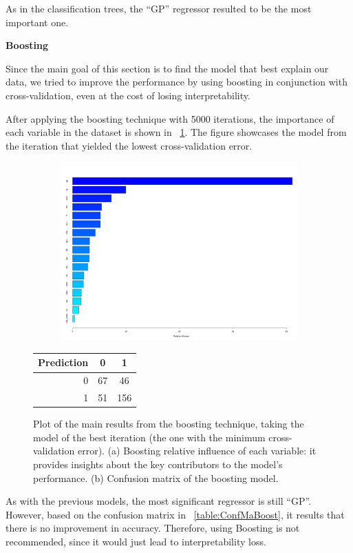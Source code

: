\noindent
As in the classification trees, the ``GP'' regressor resulted to be the most important one.

\vspace{0.2cm}
\noindent
\textbf{Boosting}

Since the main goal of this section is to find the model that best explain our data, we tried to improve the performance by using boosting in conjunction with cross-validation, even at the cost of losing interpretability. 

After applying the boosting technique with 5000 iterations, the importance of each variable in the dataset is shown in \Fig~\ref{fig:boost_4_rel_inf}. The figure showcases the model from the iteration that yielded the lowest cross-validation error.

\begin{figure}[H]
	\centering
	\begin{subfigure}{0.5\textwidth}
		\centering
		\includegraphics[width=0.8\linewidth]{ImageFiles/Classification/Trees/boost_4_rel_inf_best.pdf}
		\caption{}
		\label{fig:boost_4_rel_inf}
	\end{subfigure}%
	\hfill
	\begin{subtable}{0.5\textwidth}
		\centering
		\begin{tabular}{|| cr | cc ||}    
			\hline
			\multicolumn{2}{|c|}{Prediction} 
			& 0 & 1 \\
			\hline
			& 0 & 67 & 46 \\
			& 1 & 51 & 156 \\
			\hline
		\end{tabular}
		\caption{}
		\label{table:ConfMaBoost}
	\end{subtable}
	\caption{Plot of the main results from the boosting technique, taking the model of the best iteration (the one with the minimum cross-validation error). (a) Boosting relative influence of each variable: it provides insights about the key contributors to the model's performance. (b) Confusion matrix of the boosting model.}
	\label{BoostRes}
\end{figure}

As with the previous models, the most significant regressor is still ``GP''. However, based on the confusion matrix in \Tab~\ref{table:ConfMaBoost}, it results that there is no improvement in accuracy. Therefore, using Boosting is not recommended, since it would just lead to interpretability loss.


